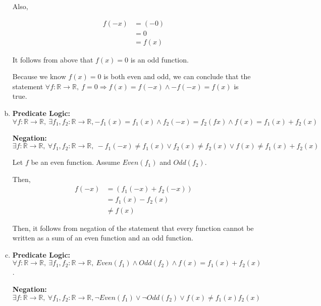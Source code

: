 \documentclass[12pt]{article}
\begin{document}
\begin{enumerate}[a.]
    \bigbreak

    Also,

    \begin{align}
        f(-x) &= (-0)\\
        &= 0\\
        &= f(x)
    \end{align}

    It follows from above that $f(x) = 0$ is an odd function.

    \bigbreak

    Because we know $f(x) = 0$ is both even and odd, we can conclude that the statement
    $\forall f: \mathbb{R} \to \mathbb{R},\:f = 0 \Rightarrow f(x) = f(-x) \land -f(-x)
    = f(x)$ is true.

    \item

    \textbf{Predicate Logic:} $\forall f:\mathbb{R} \to \mathbb{R},\:\exists f_1,
    f_2: \mathbb{R} \to \mathbb{R}, -f_1(x) = f_1(x) \land f_2(-x) = f_2(fx)
    \land f(x) = f_1(x) + f_2(x)$

    \bigskip

    \textbf{Negation:} $\exists f: \mathbb{R} \to \mathbb{R},\:\forall f_1,f_2:
    \mathbb{R} \to \mathbb{R},\:-f_1(-x) \neq f_1(x) \lor f_2(x) \neq f_2(x) \lor
    f(x) \neq f_1(x) + f_2(x)$

    \bigskip

    Let $f$ be an even function. Assume $Even(f_1)$ and $Odd(f_2)$.

    \bigskip

    Then,
    \setcounter{equation}{0}
    \begin{align}
        f(-x) &= (f_1(-x) + f_2(-x))\\
        &= f_1(x) - f_2(x)\\
        &\neq f(x)
    \end{align}

    \bigskip

    Then, it follows from negation of the statement that every function cannot be
    written as a sum of an even function and an odd function.

    \item

    \textbf{Predicate Logic:} $\forall f: \mathbb{R} \to \mathbb{R},\:\exists f_1,
    f_2: \mathbb{R} \to \mathbb{R},\:Even(f_1) \land Odd(f_2) \land f(x) = f_1(x)
    + f_2(x)$.

    \bigskip

    \textbf{Negation:} $\exists f: \mathbb{R} \to \mathbb{R},\:\forall f_1,f_2:
    \mathbb{R} \to \mathbb{R}, \neg Even(f_1) \lor \neg Odd(f_2) \lor f(x) \neq f_1(x)f_2(x)$


\end{enumerate}
\end{document}
